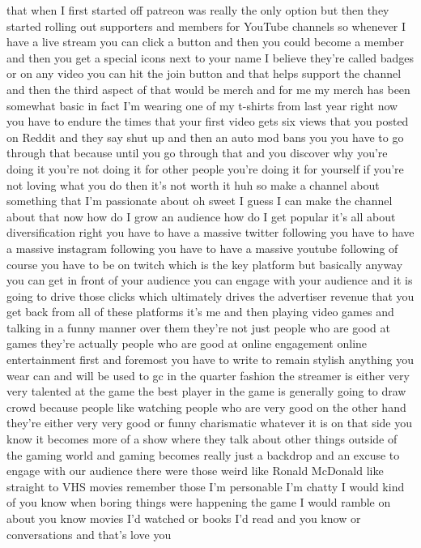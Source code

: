 \documentclass{article}%
\begin{document}
that when I first started off patreon was really the only option but then they started rolling out supporters and members for YouTube channels so whenever I have a live stream you can click a button and then you could become a member and then you get a special icons next to your name I believe they're called badges or on any video you can hit the join button and that helps support the channel and then the third aspect of that would be merch and for me my merch has been somewhat basic in fact I'm wearing one of my t{-}shirts from last year right now you have to endure the times that your first video gets six views that you posted on Reddit and they say shut up and then an auto mod bans you you have to go through that because until you go through that and you discover why you're doing it you're not doing it for other people you're doing it for yourself if you're not loving what you do then it's not worth it huh so make a channel about something that I'm passionate about oh sweet I guess I can make the channel about that now how do I grow an audience how do I get popular it's all about diversification right you have to have a massive twitter following you have to have a massive instagram following you have to have a massive youtube following of course you have to be on twitch which is the key platform but basically anyway you can get in front of your audience you can engage with your audience and it is going to drive those clicks which ultimately drives the advertiser revenue that you get back from all of these platforms it's me and then playing video games and talking in a funny manner over them they're not just people who are good at games they're actually people who are good at online engagement online entertainment first and foremost you have to write to remain stylish anything you wear can and will be used to gc in the quarter fashion the streamer is either very very talented at the game the best player in the game is generally going to draw crowd because people like watching people who are very good on the other hand they're either very very good or funny charismatic whatever it is on that side you know it becomes more of a show where they talk about other things outside of the gaming world and gaming becomes really just a backdrop and an excuse to engage with our audience there were those weird like Ronald McDonald like straight to VHS movies remember those I'm personable I'm chatty I would kind of you know when boring things were happening the game I would ramble on about you know movies I'd watched or books I'd read and you know or conversations and that's love you%
\end{document}
